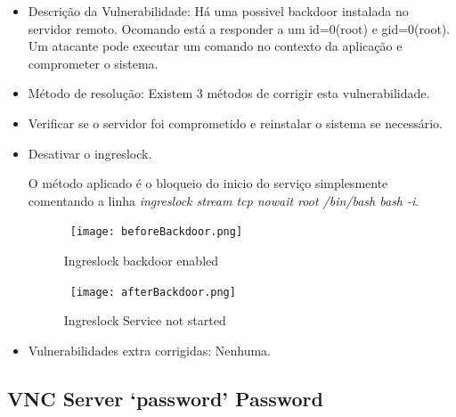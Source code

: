 \begin{itemize}
\item Descrição da Vulnerabilidade: Há uma possivel backdoor instalada no servidor remoto. Ocomando está a responder a um id=0(root) e gid=0(root). Um atacante pode executar um comando no contexto da aplicação e comprometer o sistema.

\item Método de resolução: Existem 3 métodos de corrigir esta vulnerabilidade.

\par\item Verificar se o servidor foi comprometido e reinstalar o sistema se necessário. 
\par\item Desativar o ingreslock.
\par O método aplicado é o bloqueio do inicio do serviço simplesmente comentando a linha \textit{ingreslock stream tcp nowait root /bin/bash bash -i}.
\begin{figure}[H]

  \centering

  \hbox{\hspace{-6em} \texttt{[image: beforeBackdoor.png]}}

  \caption {Ingreslock backdoor enabled}

  \label {fig3}

\end{figure}
\begin{figure}[H]

  \centering

  \hbox{\hspace{-6em} \texttt{[image: afterBackdoor.png]}}

  \caption {Ingreslock Service not started}

  \label {fig3}

\end{figure}
\item Vulnerabilidades extra corrigidas: Nenhuma.
\end{itemize}

\subsection{VNC Server ‘password’ Password}


